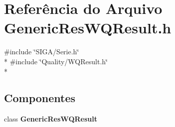 \section{Referência do Arquivo Generic\+Res\+W\+Q\+Result.\+h}
\label{_generic_res_w_q_result_8h}
{\ttfamily \#include \char`\"{}S\+I\+G\+A/\+Serie.\+h\char`\"{}}\\*
{\ttfamily \#include \char`\"{}Quality/\+W\+Q\+Result.\+h\char`\"{}}\\*
\subsection*{Componentes}
\begin{DoxyCompactItemize}
\item 
class {\bf Generic\+Res\+W\+Q\+Result}
\end{DoxyCompactItemize}
